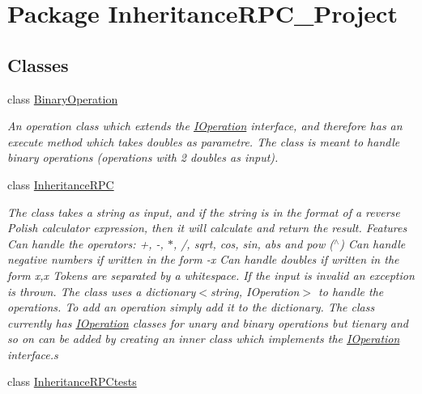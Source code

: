 \hypertarget{namespace_inheritance_r_p_c___project}{\section{Package Inheritance\+R\+P\+C\+\_\+\+Project}
\label{namespace_inheritance_r_p_c___project}
}
\subsection*{Classes}
\begin{DoxyCompactItemize}
\item 
class \hyperlink{class_inheritance_r_p_c___project_1_1_binary_operation}{Binary\+Operation}
\begin{DoxyCompactList}\small\item\em An operation class which extends the \hyperlink{interface_inheritance_r_p_c___project_1_1_i_operation}{I\+Operation} interface, and therefore has an execute method which takes doubles as parametre. The class is meant to handle binary operations (operations with 2 doubles as input). \end{DoxyCompactList}\item 
class \hyperlink{class_inheritance_r_p_c___project_1_1_inheritance_r_p_c}{Inheritance\+R\+P\+C}
\begin{DoxyCompactList}\small\item\em The class takes a string as input, and if the string is in the format of a reverse Polish calculator expression, then it will calculate and return the result. Features Can handle the operators\+: +, -\/, $\ast$, /, sqrt, cos, sin, abs and pow ($^\wedge$) Can handle negative numbers if written in the form -\/x Can handle doubles if written in the form x,x Tokens are separated by a whitespace. If the input is invalid an exception is thrown. The class uses a dictionary$<$string, I\+Operation$>$ to handle the operations. To add an operation simply add it to the dictionary. The class currently has \hyperlink{interface_inheritance_r_p_c___project_1_1_i_operation}{I\+Operation} classes for unary and binary operations but tienary and so on can be added by creating an inner class which implements the \hyperlink{interface_inheritance_r_p_c___project_1_1_i_operation}{I\+Operation} interface.\+s \end{DoxyCompactList}\item 
class \hyperlink{class_inheritance_r_p_c___project_1_1_inheritance_r_p_ctests}{Inheritance\+R\+P\+Ctests}

\end{DoxyCompactItemize}
